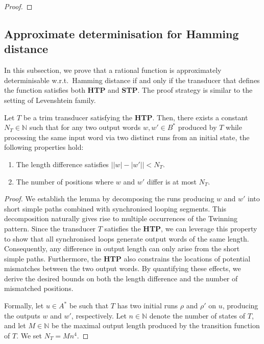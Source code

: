 \documentclass[a4paper,UKenglish,cleveref, autoref, thm-restate,authorcolumns, colorlinks]{lipics-v2021}
\newcommand{\STP}[0]{\textbf{STP}}
\newcommand{\HTP}[0]{\textbf{HTP}}
\begin{document}
{\begin{proof}
\end{proof}

\subsection{Approximate determinisation for Hamming distance}\label{subsec:ham}
In this subsection, we prove that a rational function is approximately determinisable w.r.t.~Hamming distance if and only if the transducer that defines the function satisfies both \HTP{} and \STP{}. The proof strategy is similar to the setting of Levenshtein family.
    \begin{lemma}\label{claim:HP}
    Let $T$ be a trim transducer satisfying the \HTP{}. Then, there exists a constant $N_T \in \mathbb{N}$ such that for any two output words $w, w' \in B^*$ produced by $T$ while processing the same input word via two distinct runs from an initial state, the following properties hold:
    \begin{enumerate}
        \item\label{item:sameLength} The length difference satisfies $\big||w| - |w'|\big| < N_T$.
        \item\label{item:mismatch} The number of positions where $w$ and $w'$ differ is at most $N_T$.
    \end{enumerate}
    \end{lemma}


    \begin{proof}
    We establish the lemma by decomposing the runs producing $w$ and $w'$ into short simple paths combined
    with synchronised looping segments.
    This decomposition naturally gives rise to multiple occurrences of the Twinning pattern.
    Since the transducer $T$ satisfies the \HTP{},
    we can leverage this property to show that all synchronised loops
    generate output words of the same length.
    Consequently, any difference in output length can only arise from the short simple paths.
    Furthermore, the \HTP{} also constrains the locations of potential mismatches between the two output words.
    By quantifying these effects, we derive the desired bounds on both the length difference
    and the number of mismatched positions.
    
    Formally, let $u \in A^*$ be such that $T$ has two initial runs $\rho$ and $\rho'$ on $u$,
    producing the outputs $w$ and $w'$, respectively. 
    Let $n \in \mathbb{N}$ denote the number of states of $T$,
    and let $M \in \mathbb{N}$ be the maximal output length produced by the transition function of $T$.
    We set $N_T = Mn^4$.
    

\end{proof}}
\end{document}
